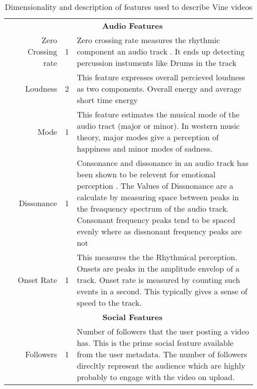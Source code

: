 \begin{table*}[t]
{\begin{tabular}{|c|r|c|p{20cm}|}
	\cline{2-4}
    & \multicolumn{3}{c|}{\textbf{Audio Features}} \\
	\cline{2-4}
	& Zero Crossing rate & 1 & Zero crossing rate measures the rhythmic component an audio track \cite{laurier2009exploring}. It ends up detecting percussion instuments like Drums in the track\\
	& Loudness & 2 & This feature expresses overall percieved loudness as two components. Overall energy and average short time energy \cite{lartillot2007matlab}\\
	& Mode & 1 & This feature estimates the musical mode of the audio tract (major or minor). In western music theory, major modes give a perception of happiness and minor modes of sadness. \cite{laurier2009exploring} \\
	& Dissonance & 1 & Consonance and dissonance in an audio track has been shown to be relevent for emotional perception \cite{laurier2009exploring}. The Values of Dissnonance are a calculate by measuring space between peaks in the freaquency spectrum of the audio track. Consonant frequency peaks tend to be spaced evenly where as dissnonant frequency peaks are not\\
	& Onset Rate & 1 & This measures the the Rhythmical perception. Onsets are peaks in the amplitude envelop of a track. Onset rate is measured by counting such events in a second. This typically gives a sense of speed to the track. \\
	\cline{2-4}
     &	\multicolumn{3}{c|}{\textbf{Social Features}} \\
	\cline{2-4}
	& Followers & 1 & Number of followers that the user posting a video has. This is the prime social feature available from the user metadata. The number of followers direcltly represent the audience which are highly probably to engage with the video on upload.\\
	\hline
    \end{tabular}
    }
        \caption{Dimensionality and description of features used to describe Vine videos}
       \label{tab:Features_table}
       \vspace{-5mm}
\end{table*}
